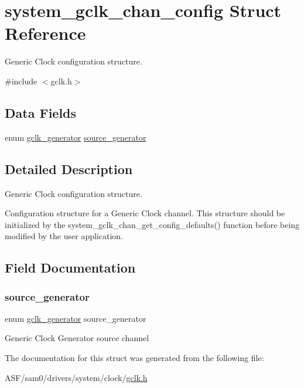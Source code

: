 \hypertarget{structsystem__gclk__chan__config}{}\section{system\+\_\+gclk\+\_\+chan\+\_\+config Struct Reference}
\label{structsystem__gclk__chan__config}


Generic Clock configuration structure.  




{\ttfamily \#include $<$gclk.\+h$>$}

\subsection*{Data Fields}
\begin{DoxyCompactItemize}
\item 
enum \mbox{\hyperlink{group__asfdoc__sam0__system__clock__group_ga1ab9bb87560ad127ed982591b7d67311}{gclk\+\_\+generator}} \mbox{\hyperlink{structsystem__gclk__chan__config_a1636ef529811c2c45213b046ee02cb49}{source\+\_\+generator}}
\end{DoxyCompactItemize}


\subsection{Detailed Description}
Generic Clock configuration structure. 

Configuration structure for a Generic Clock channel. This structure should be initialized by the system\+\_\+gclk\+\_\+chan\+\_\+get\+\_\+config\+\_\+defaults() function before being modified by the user application. 

\subsection{Field Documentation}
\mbox{\label{structsystem__gclk__chan__config_a1636ef529811c2c45213b046ee02cb49}} 
\subsubsection{\texorpdfstring{source\_generator}{source\_generator}}
{\footnotesize\ttfamily enum \mbox{\hyperlink{group__asfdoc__sam0__system__clock__group_ga1ab9bb87560ad127ed982591b7d67311}{gclk\+\_\+generator}} source\+\_\+generator}

Generic Clock Generator source channel 

The documentation for this struct was generated from the following file\+:\begin{DoxyCompactItemize}
\item 
A\+S\+F/sam0/drivers/system/clock/\mbox{\hyperlink{drivers_2system_2clock_2gclk_8h}{gclk.\+h}}\end{DoxyCompactItemize}
